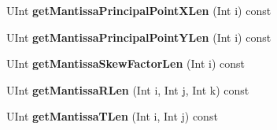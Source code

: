 \begin{DoxyCompactItemize}
U\+Int {\bfseries get\+Mantissa\+Principal\+Point\+X\+Len} (Int i) const
\item 
\mbox{\label{class_s_e_i_multiview_acquisition_info_a70ac59ddfb952b7e5c17058ca5616d4f}} 
U\+Int {\bfseries get\+Mantissa\+Principal\+Point\+Y\+Len} (Int i) const
\item 
\mbox{\label{class_s_e_i_multiview_acquisition_info_acf487356298826e0e9cc9bb4ea467e93}} 
U\+Int {\bfseries get\+Mantissa\+Skew\+Factor\+Len} (Int i) const
\item 
\mbox{\label{class_s_e_i_multiview_acquisition_info_a970e5f2ecaeca201fced8e59344350fc}} 
U\+Int {\bfseries get\+Mantissa\+R\+Len} (Int i, Int j, Int k) const
\item 
\mbox{\label{class_s_e_i_multiview_acquisition_info_a560882280ea2418f89a0fdfcc778b94f}} 
U\+Int {\bfseries get\+Mantissa\+T\+Len} (Int i, Int j) const
\end{DoxyCompactItemize}
